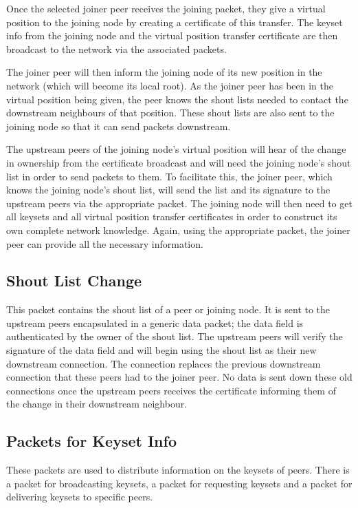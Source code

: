\documentclass[ %
                    author={Luke Murray},
                supervisor={Dr. Simon Hollis},
                     title={Shadow Peer-to-Peer Networks},
                  subtitle={},
                    degree={MEng},
                      year={2013} ]{thesis}
\begin{document}
Once the selected joiner peer receives the joining packet, they give a virtual position to the joining node by creating a certificate of this transfer. The keyset info from the joining node and the virtual position transfer certificate are then broadcast to the network via the associated packets.

The joiner peer will then inform the joining node of its new position in the network (which will become its local root). As the joiner peer has been in the virtual position being given, the peer knows the shout lists needed to contact the downstream neighbours of that position. These shout lists are also sent to the joining node so that it can send packets downstream.

The upstream peers of the joining node's virtual position will hear of the change in ownership from the certificate broadcast and will need the joining node's shout list in order to send packets to them. To facilitate this, the joiner peer, which knows the joining node's shout list, will send the list and its signature to the upstream peers via the appropriate packet. The joining node will then need to get all keysets and all virtual position transfer certificates in order to construct its own complete network knowledge. Again, using the appropriate packet, the joiner peer can provide all the necessary information.

\subsection{Shout List Change}

This packet contains the shout list of a peer or joining node. It is sent to the upstream peers encapsulated in a generic data packet; the data field is authenticated by the owner of the shout list. The upstream peers will verify the signature of the data field and will begin using the shout list as their new downstream connection. The connection replaces the previous downstream connection that these peers had to the joiner peer. No data is sent down these old connections once the upstream peers receives the certificate informing them of the change in their downstream neighbour.

\subsection{Packets for Keyset Info}
\label{keysetinfo}

These packets are used to distribute information on the keysets of peers. There is a packet for broadcasting keysets, a packet for requesting keysets and a packet for delivering keysets to specific peers.
\end{document}
